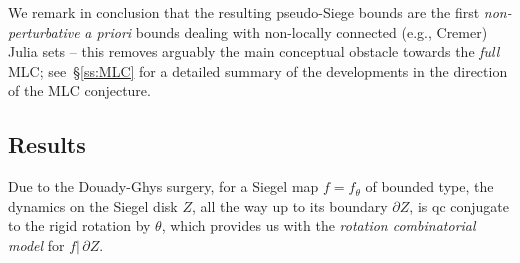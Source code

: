 \documentclass{amsart}
\newcommand{\1}{{\mathbb 1 }}
\theoremstyle{remark}
\numberwithin{equation}{section}
\theoremstyle{definition}
\newcommand{\di}{\partial}
\begin{document}
 
 
 We remark  in conclusion that the resulting pseudo-Siege bounds are the first \emph{non-perturbative} \emph{a priori} bounds dealing with non-locally connected (e.g., Cremer) Julia sets -- this removes arguably the main conceptual obstacle towards the \emph{full} MLC; see~\S\ref{ss:MLC} for a detailed summary of the developments in the direction of the MLC conjecture.


\subsection{Results} Due to the Douady-Ghys surgery, 
for a Siegel map $f=f_\theta$ of bounded type, the dynamics on the
Siegel disk $Z$, all the way up to  its boundary $\partial Z$, is  qc conjugate to 
the rigid rotation by $\theta$, which provides us with  the
{\em rotation combinatorial model} for $f|\, \di Z$.
\end{document}
